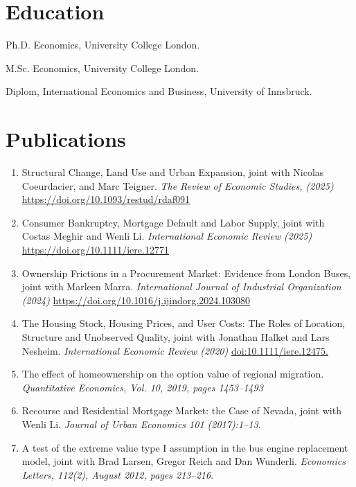 \documentclass[letterpaper]{article}
\renewenvironment{itemize}{
  \begin{list}{}{
    \setlength{\leftmargin}{1.5em}
  }
}{
  \end{list}
}
\begin{document}
\section*{Education}

\begin{itemize}
  \setlength{\itemindent}{26pt}
  \item[2015:] Ph.D. Economics, University College London.
   
  \item[2008:] M.Sc. Economics, University College London.

  \item[2006:] Diplom, International Economics and Business, University of Innsbruck.

\end{itemize}


\section*{Publications}

\begin{enumerate}
\item Structural Change, Land Use and Urban Expansion, joint with Nicolas Coeurdacier, and Marc Teigner. {\it The Review of Economic Studies, (2025)} \url{https://doi.org/10.1093/restud/rdaf091}
\item Consumer Bankruptcy, Mortgage Default and Labor Supply, joint with Costas Meghir and Wenli Li. {\it International Economic Review (2025)} \url{https://doi.org/10.1111/iere.12771}
\item Ownership Frictions in a Procurement Market: Evidence from London Buses, joint with Marleen Marra. {\it International Journal of Industrial Organization (2024)} \url{https://doi.org/10.1016/j.ijindorg.2024.103080}
\item The Housing Stock, Housing Prices, and User Costs: The Roles of Location, Structure and Unobserved Quality, joint with Jonathan Halket and Lars Nesheim. {\it International Economic Review (2020)} \url{doi:10.1111/iere.12475.}
\item The effect of homeownership on the option value of regional migration. {\it Quantitative Economics, Vol. 10, 2019, pages 1453--1493}
\item Recourse and Residential Mortgage Market: the Case of Nevada, joint with Wenli Li. {\it Journal of Urban Economics 101 (2017):1–13}.
\item A test of the extreme value type I assumption in the bus engine replacement model, joint with Brad Larsen, Gregor Reich and Dan Wunderli. {\it Economics Letters, 112(2), August 2012, pages 213--216}.





\end{enumerate}
\end{document}
